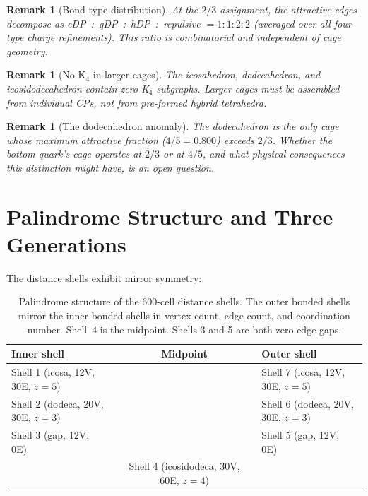 \documentclass[11pt,letterpaper]{article}
\newtheorem{remark}[theorem]{Remark}
\begin{document}
\begin{remark}[Bond type distribution]
At the $2/3$ assignment, the attractive edges decompose as
eDP~:~qDP~:~hDP~:~repulsive $= 1:1:2:2$ (averaged over all
four-type charge refinements).  This ratio is combinatorial and
independent of cage geometry.
\end{remark}

\begin{remark}[No K$_4$ in larger cages]
The icosahedron, dodecahedron, and icosidodecahedron contain
\emph{zero} K$_4$ subgraphs.  Larger cages must be assembled
from individual CPs, not from pre-formed hybrid tetrahedra.
\end{remark}

\begin{remark}[The dodecahedron anomaly]
The dodecahedron is the only cage whose maximum attractive fraction
($4/5 = 0.800$) exceeds $2/3$.  Whether the bottom quark's cage
operates at $2/3$ or at $4/5$, and what physical consequences this
distinction might have, is an open question.
\end{remark}

\section{Palindrome Structure and Three Generations}
\label{sec:palindrome}

The distance shells exhibit mirror symmetry:

\begin{table}[H]
\centering
\caption{Palindrome structure of the 600-cell distance shells.
  The outer bonded shells mirror the inner bonded shells in vertex
  count, edge count, and coordination number.  Shell~4 is the
  midpoint.  Shells 3 and 5 are both zero-edge gaps.}
\label{tab:palindrome}
\begin{tabular}{@{}lcccl@{}}
\toprule
Inner shell & & Midpoint & & Outer shell \\
\midrule
Shell 1 (icosa, 12V, 30E, $z{=}5$) & & & & Shell 7 (icosa, 12V, 30E, $z{=}5$) \\
Shell 2 (dodeca, 20V, 30E, $z{=}3$) & & & & Shell 6 (dodeca, 20V, 30E, $z{=}3$) \\
Shell 3 (gap, 12V, 0E) & & & & Shell 5 (gap, 12V, 0E) \\
 & & Shell 4 (icosidodeca, 30V, 60E, $z{=}4$) & & \\
\bottomrule
\end{tabular}
\end{table}
\end{document}
